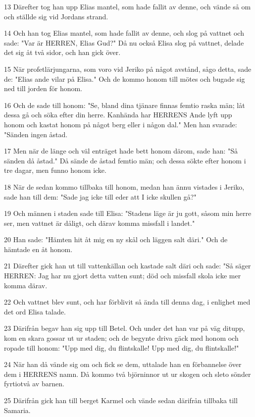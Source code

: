 \par 13 Därefter tog han upp Elias mantel, som hade fallit av denne, och vände så om och ställde sig vid Jordans strand.
\par 14 Och han tog Elias mantel, som hade fallit av denne, och slog på vattnet och sade: "Var är HERREN, Elias Gud?" Då nu också Elisa slog på vattnet, delade det sig åt två sidor, och han gick över.
\par 15 När profetlärjungarna, som voro vid Jeriko på något avstånd, sågo detta, sade de: "Elias ande vilar på Elisa." Och de kommo honom till mötes och bugade sig ned till jorden för honom.
\par 16 Och de sade till honom: "Se, bland dina tjänare finnas femtio raska män; låt dessa gå och söka efter din herre. Kanhända har HERRENS Ande lyft upp honom och kastat honom på något berg eller i någon dal." Men han svarade: "Sänden ingen åstad.
\par 17 Men när de länge och väl enträget hade bett honom därom, sade han: "Så sänden då åstad." Då sände de åstad femtio män; och dessa sökte efter honom i tre dagar, men funno honom icke.
\par 18 När de sedan kommo tillbaka till honom, medan han ännu vistades i Jeriko, sade han till dem: "Sade jag icke till eder att I icke skullen gå?"
\par 19 Och männen i staden sade till Elisa: "Stadens läge är ju gott, såsom min herre ser, men vattnet är dåligt, och därav komma missfall i landet."
\par 20 Han sade: "Hämten hit åt mig en ny skål och läggen salt däri." Och de hämtade en åt honom.
\par 21 Därefter gick han ut till vattenkällan och kastade salt däri och sade: "Så säger HERREN: Jag har nu gjort detta vatten sunt; död och missfall skola icke mer komma därav.
\par 22 Och vattnet blev sunt, och har förblivit så ända till denna dag, i enlighet med det ord Elisa talade.
\par 23 Därifrån begav han sig upp till Betel. Och under det han var på väg ditupp, kom en skara gossar ut ur staden; och de begynte driva gäck med honom och ropade till honom: "Upp med dig, du flintskalle! Upp med dig, du flintskalle!"
\par 24 När han då vände sig om och fick se dem, uttalade han en förbannelse över dem i HERRENS namn. Då kommo två björninnor ut ur skogen och sleto sönder fyrtiotvå av barnen.
\par 25 Därifrån gick han till berget Karmel och vände sedan därifrån tillbaka till Samaria.

